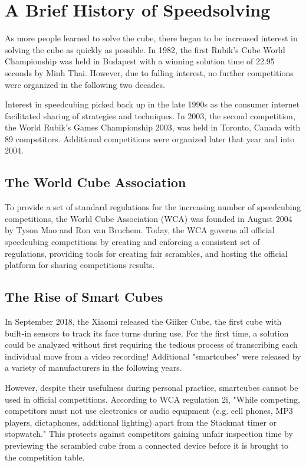 \section{A Brief History of Speedsolving}
\label{sec:speedsolving}

As more people learned to solve the cube, there began to be increased
interest in solving the cube as quickly as possible. In 1982, the first
Rubik's Cube World Championship was held in Budapest with a winning
solution time of 22.95 seconds by Minh Thai. However, due to falling
interest, no further competitions were organized in the following two
decades.

Interest in speedcubing picked back up in the late 1990s as the
consumer internet facilitated sharing of strategies and techniques. In
2003, the second competition, the World Rubik's Games Championship
2003, was held in Toronto, Canada with 89 competitors. Additional
competitions were organized later that year and into 2004.
\cite{wca-speedcubing-history}

\subsection{The World Cube Association}
\label{subsec:the-world-cube-association}

To provide a set of standard regulations for the increasing number of
speedcubing competitions, the World Cube Association (WCA) was founded
in August 2004 by Tyson Mao and Ron van Bruchem. Today, the WCA governs
all official speedcubing competitions by creating and enforcing a
consistent set of regulations, providing tools for creating fair
scrambles, and hosting the official platform for sharing competitions
results. \cite{wca-speedcubing-history}

\subsection{The Rise of Smart Cubes}
\label{subsec:the-rise-of-smart-cubes}

In September 2018, the Xiaomi released the Giiker Cube, the first cube
with built-in sensors to track its face turns during use.
\cite{giiker-thecubicle} For the first time, a solution could be
analyzed without first requiring the tedious process of transcribing
each individual move from a video recording! Additional "smartcubes"
were released by a variety of manufacturers in the following years.
\cite{gocube-product-launch-video} \cite{gans356i-thecubicle}
\cite{gocube-rubiksconnected}

However, despite their usefulness during personal practice, smartcubes
cannot be used in official competitions. According to WCA regulation
2i, "While competing, competitors must not use electronics or audio
equipment (e.g. cell phones, MP3 players, dictaphones, additional
lighting) apart from the Stackmat timer or stopwatch."
\cite{wca-regulations} This protects against competitors gaining unfair
inspection time by previewing the scrambled cube from a connected
device before it is brought to the competition table.
